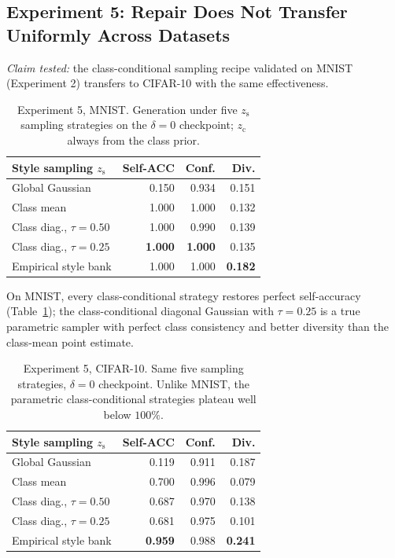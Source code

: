 \documentclass[10pt,letterpaper]{article}
\newcommand{\zc}{z_{\mathrm{c}}}
\newcommand{\zs}{z_{\mathrm{s}}}
\begin{document}
\subsection{Experiment 5: Repair Does Not Transfer Uniformly Across Datasets}
\label{sec:cifar-sampling}
\label{sec:sampling}

\emph{Claim tested:} the class-conditional sampling recipe validated on
MNIST (Experiment 2) transfers to CIFAR-10 with the same effectiveness.

\begin{table}[t]
\centering
\small
\caption{Experiment 5, MNIST. Generation under five $\zs$ sampling
         strategies on the $\delta{=}0$ checkpoint; $\zc$ always from the
         class prior.}
\label{tab:sampling}
\begin{tabular}{lrrr}
\toprule
Style sampling $\zs$ & Self-ACC & Conf. & Div. \\
\midrule
Global Gaussian            & 0.150 & 0.934 & 0.151 \\
Class mean                 & 1.000 & 1.000 & 0.132 \\
Class diag., $\tau{=}0.50$ & 1.000 & 0.990 & 0.139 \\
Class diag., $\tau{=}0.25$ & \textbf{1.000} & \textbf{1.000} & 0.135 \\
Empirical style bank       & 1.000 & 1.000 & \textbf{0.182} \\
\bottomrule
\end{tabular}
\end{table}

On MNIST, every class-conditional strategy restores perfect self-accuracy
(Table~\ref{tab:sampling}); the class-conditional diagonal Gaussian with
$\tau{=}0.25$ is a true parametric sampler with perfect class consistency
and better diversity than the class-mean point estimate.

\begin{table}[t]
\centering
\small
\caption{Experiment 5, CIFAR-10. Same five sampling strategies, $\delta{=}0$
         checkpoint. Unlike MNIST, the parametric class-conditional
         strategies plateau well below $100\%$.}
\label{tab:cifar-sampling}
\begin{tabular}{lrrr}
\toprule
Style sampling $\zs$ & Self-ACC & Conf. & Div. \\
\midrule
Global Gaussian            & 0.119 & 0.911 & 0.187 \\
Class mean                 & 0.700 & 0.996 & 0.079 \\
Class diag., $\tau{=}0.50$ & 0.687 & 0.970 & 0.138 \\
Class diag., $\tau{=}0.25$ & 0.681 & 0.975 & 0.101 \\
Empirical style bank       & \textbf{0.959} & 0.988 & \textbf{0.241} \\
\bottomrule
\end{tabular}
\end{table}
\end{document}
